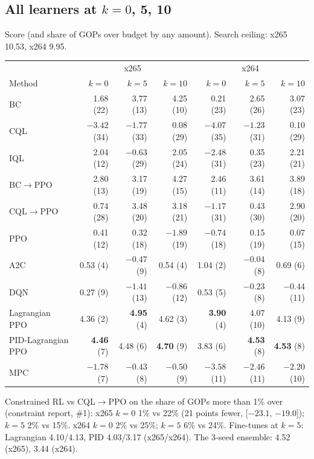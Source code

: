\documentclass[10pt,a4paper]{article}
\begin{document}
\subsection{All learners at $k=0$, 5, 10}
Score (and share of GOPs over budget by any amount). Search ceiling: x265 10.53, x264 9.95.
\begin{center}\small
\begin{tabular}{lrrr|rrr}
\toprule
& \multicolumn{3}{c|}{x265} & \multicolumn{3}{c}{x264} \\
Method & $k=0$ & $k=5$ & $k=10$ & $k=0$ & $k=5$ & $k=10$ \\\midrule
BC & 1.68 (22) & 3.77 (13) & 4.25 (10) & 0.21 (23) & 2.65 (26) & 3.07 (23) \\
CQL & $-3.42$ (34) & $-1.77$ (33) & 0.08 (29) & $-4.07$ (35) & $-1.23$ (31) & 0.10 (29) \\
IQL & 2.04 (12) & $-0.63$ (29) & 2.05 (24) & $-2.48$ (31) & 0.35 (23) & 2.21 (21) \\
BC$\to$PPO & 2.80 (13) & 3.17 (19) & 4.27 (15) & 2.46 (11) & 3.61 (14) & 3.89 (18) \\
CQL$\to$PPO & 0.74 (28) & 3.48 (20) & 3.18 (21) & $-1.17$ (31) & 0.43 (30) & 2.90 (20) \\
PPO & 0.41 (12) & 0.32 (18) & $-1.89$ (19) & $-0.74$ (18) & 0.15 (19) & 0.07 (15) \\
A2C & 0.53 (4) & $-0.47$ (9) & 0.54 (4) & 1.04 (2) & $-0.04$ (8) & 0.69 (6) \\
DQN & 0.27 (9) & $-1.41$ (13) & $-0.86$ (12) & 0.53 (5) & $-0.23$ (8) & $-0.44$ (11) \\
Lagrangian PPO & 4.36 (2) & \textbf{4.95} (4) & 4.62 (3) & \textbf{3.90} (4) & 4.07 (10) & 4.13 (9) \\
PID-Lagrangian PPO & \textbf{4.46} (7) & 4.48 (6) & \textbf{4.70} (9) & 3.83 (6) & \textbf{4.53} (8) & \textbf{4.53} (8) \\
MPC & $-1.78$ (7) & $-0.43$ (8) & $-0.50$ (9) & $-3.58$ (11) & $-2.46$ (11) & $-2.20$ (10) \\
\bottomrule
\end{tabular}
\end{center}
Constrained RL vs CQL$\to$PPO on the share of GOPs more than 1\% over (constraint report, \#1): x265 $k=0$
1\% vs 22\% (21 points fewer, [$-23.1$, $-19.0$]); $k=5$ 2\% vs 15\%. x264 $k=0$ 2\% vs 25\%; $k=5$ 6\% vs 24\%.
Fine-tunes at $k=5$: Lagrangian 4.10/4.13, PID 4.03/3.17 (x265/x264). The 3-seed ensemble: 4.52 (x265), 3.44 (x264).
\end{document}
